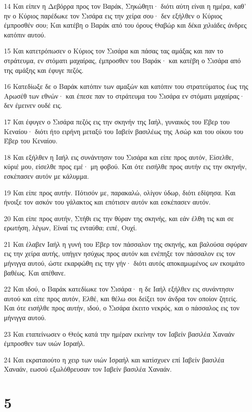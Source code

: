 \par 14 Και είπεν η Δεβόρρα προς τον Βαράκ, Σηκώθητι· διότι αύτη είναι η ημέρα, καθ' ην ο Κύριος παρέδωκε τον Σισάρα εις την χείρα σου· δεν εξήλθεν ο Κύριος έμπροσθέν σου; Και κατέβη ο Βαράκ από του όρους Θαβώρ και δέκα χιλιάδες άνδρες κατόπιν αυτού.
\par 15 Και κατετρόπωσεν ο Κύριος τον Σισάρα και πάσας τας αμάξας και παν το στράτευμα, εν στόματι μαχαίρας, έμπροσθεν του Βαράκ· και κατέβη ο Σισάρα από της αμάξης και έφυγε πεζός.
\par 16 Κατεδίωξε δε ο Βαράκ κατόπιν των αμαξών και κατόπιν του στρατεύματος έως της Αρωσέθ των εθνών· και έπεσε παν το στράτευμα του Σισάρα εν στόματι μαχαίρας· δεν έμεινεν ουδέ εις.
\par 17 Και έφυγεν ο Σισάρα πεζός εις την σκηνήν της Ιαήλ, γυναικός του Έβερ του Κεναίου· διότι ήτο ειρήνη μεταξύ του Ιαβείν βασιλέως της Ασώρ και του οίκου του Έβερ του Κεναίου.
\par 18 Και εξήλθεν η Ιαήλ εις συνάντησιν του Σισάρα και είπε προς αυτόν, Είσελθε, κύριέ μου, είσελθε προς εμέ· μη φοβού. Και ότε εισήλθε προς αυτήν εις την σκηνήν, εσκέπασεν αυτόν με κάλυμμα.
\par 19 Και είπε προς αυτήν. Πότισόν με, παρακαλώ, ολίγον ύδωρ, διότι εδίψησα. Και ήνοιξε τον ασκόν του γάλακτος και επότισεν αυτόν και εσκέπασεν αυτόν.
\par 20 Και είπε προς αυτήν, Στήθι εις την θύραν της σκηνής, και εάν έλθη τις και σε ερωτήση, λέγων, Είναί τις ενταύθα; ειπέ, Ουχί.
\par 21 Και έλαβεν Ιαήλ η γυνή του Έβερ τον πάσσαλον της σκηνής, και βαλούσα σφύραν εις την χείρα αυτής, υπήγεν ησύχως προς αυτόν και ενέπηξε τον πάσσαλον εις τον μήνιγγα αυτού, ώστε εκαρφώθη εις την γήν· διότι αυτός αποκαμωμένος ων εκοιμάτο βαθέως. Και απέθανε.
\par 22 Και ιδού, ο Βαράκ κατεδίωκε τον Σισάρα· η δε Ιαήλ εξήλθεν εις συνάντησιν αυτού και είπε προς αυτόν, Ελθέ, και θέλω σοι δείξει τον άνδρα τον οποίον ζητείς. Και ότε εισήλθε προς αυτήν, ιδού, ο Σισάρα έκειτο νεκρός, και ο πάσσαλος εις τον μήνιγγα αυτού.
\par 23 Και εταπείνωσεν ο Θεός κατά την ημέραν εκείνην τον Ιαβείν βασιλέα Χαναάν έμπροσθεν των υιών Ισραήλ.
\par 24 Και εκραταιούτο η χειρ των υιών Ισραήλ και κατίσχυεν επί Ιαβείν βασιλέα Χαναάν, εωσού εξωλόθρευσαν τον Ιαβείν βασιλέα Χαναάν.

\chapter{5}

